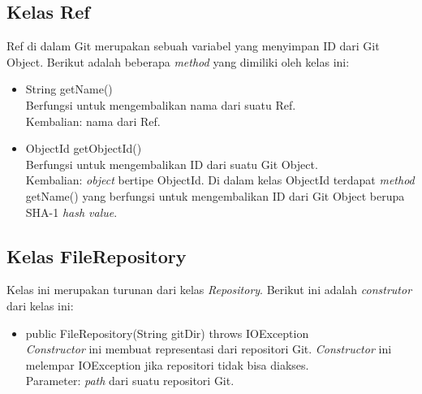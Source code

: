 \subsection{Kelas Ref}
\label{subsec:ref}
Ref di dalam Git merupakan sebuah variabel yang menyimpan ID dari Git Object.
Berikut adalah beberapa \textit{method} yang dimiliki oleh kelas ini:
\begin{itemize}
\item String getName()\\
Berfungsi untuk mengembalikan nama dari suatu Ref.\\
Kembalian: nama dari Ref.
\item ObjectId getObjectId()\\
Berfungsi untuk mengembalikan ID dari suatu Git Object.\\
Kembalian: \textit{object} bertipe ObjectId. Di dalam kelas ObjectId terdapat \textit{method} getName() yang berfungsi untuk mengembalikan ID dari Git Object berupa SHA-1 \textit{hash value}. 
\end{itemize}



\subsection{Kelas FileRepository}
\label{subsec:filerepository}
Kelas ini merupakan turunan dari kelas \textit{Repository}. Berikut ini adalah \textit{construtor} dari kelas ini:
\begin{itemize}
\item public FileRepository(String gitDir) throws IOException\\
\textit{Constructor} ini membuat representasi dari repositori Git. \textit{Constructor} ini melempar IOException jika repositori tidak bisa diakses.\\
Parameter: \textit{path} dari suatu repositori Git.
\end{itemize}

